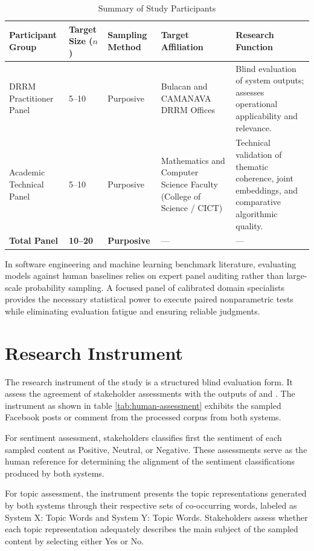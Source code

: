 \begin{table}[htbp]
	\centering
	\caption{Summary of Study Participants}
	\label{tab:participants}
	\begin{tabularx}{\textwidth}{XXXXX}
		\toprule
		\textbf{Participant Group} & \textbf{Target Size ($n$)} &
		\textbf{Sampling Method} & \textbf{Target Affiliation} &
		\textbf{Research Function} \\
		\midrule
		DRRM Practitioner Panel & 5--10 & Purposive &
		Bulacan and CAMANAVA DRRM Offices &
		Blind evaluation of system outputs; assesses operational applicability and relevance. \\
		\addlinespace
		Academic Technical Panel & 5--10 & Purposive &
		Mathematics and Computer Science Faculty (College of Science / CICT) &
		Technical validation of thematic coherence, joint embeddings, and
		comparative algorithmic quality. \\
		\addlinespace
		\textbf{Total Panel} & \textbf{10--20} & \textbf{Purposive} & --- & --- \\
		\bottomrule
	\end{tabularx}
\end{table}

In software engineering and machine learning benchmark literature, evaluating
models against human baselines relies on expert panel auditing rather than
large-scale probability sampling. A focused panel of calibrated domain
specialists provides the necessary statistical power to execute paired nonparametric tests while eliminating evaluation fatigue and ensuring reliable
judgments.

\section*{Research Instrument}

The research instrument of the study is a structured blind evaluation form. It assess the agreement of stakeholder assessments with the outputs of
\sysA{} and \sysB. The instrument as shown in table \ref{tab:human-assessment} exhibits the sampled Facebook posts or comment from the processed corpus from both systems.

For sentiment assessment, stakeholders classifies first the sentiment of each sampled content as Positive, Neutral, or Negative. These assessments serve as the human reference for determining the alignment of the sentiment classifications produced by both systems.

For topic assessment, the instrument presents the topic representations generated by both systems through their respective sets of co-occurring words, labeled as System X: Topic Words and System Y: Topic Words. Stakeholders assess whether each topic representation adequately describes the main subject of the sampled content by selecting either Yes or No.

